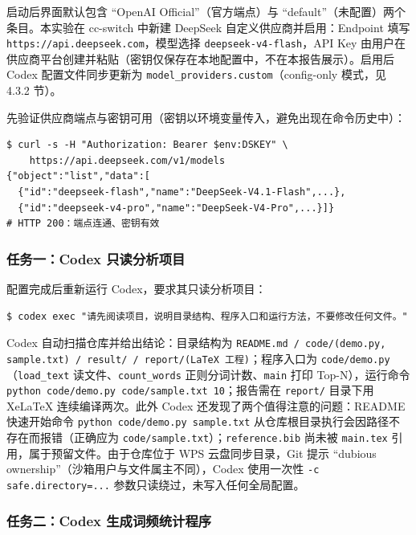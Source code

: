 \documentclass{SYSUReport}
\begin{document}
启动后界面默认包含 “OpenAI Official”（官方端点）与 “default”（未配置）两个条目。本实验在 cc-switch 中新建 DeepSeek 自定义供应商并启用：Endpoint 填写 \texttt{https://api.deepseek.com}，模型选择 \texttt{deepseek-v4-flash}，API Key 由用户在供应商平台创建并粘贴（密钥仅保存在本地配置中，不在本报告展示）。启用后 Codex 配置文件同步更新为 \texttt{model\_providers.custom}（config-only 模式，见 4.3.2 节）。

先验证供应商端点与密钥可用（密钥以环境变量传入，避免出现在命令历史中）：

\begin{lstlisting}[caption={验证 DeepSeek 供应商端点}]
$ curl -s -H "Authorization: Bearer $env:DSKEY" \
    https://api.deepseek.com/v1/models
{"object":"list","data":[
  {"id":"deepseek-flash","name":"DeepSeek-V4.1-Flash",...},
  {"id":"deepseek-v4-pro","name":"DeepSeek-V4-Pro",...}]}
# HTTP 200：端点连通、密钥有效
\end{lstlisting}

\subsubsection{任务一：Codex 只读分析项目}

配置完成后重新运行 Codex，要求其只读分析项目：

\begin{lstlisting}[caption={Codex 任务一：只读分析项目}]
$ codex exec "请先阅读项目，说明目录结构、程序入口和运行方法，不要修改任何文件。"
\end{lstlisting}

Codex 自动扫描仓库并给出结论：目录结构为 \texttt{README.md / code/(demo.py, sample.txt) / result/ / report/(LaTeX 工程)}；程序入口为 \texttt{code/demo.py}（\texttt{load\_text} 读文件、\texttt{count\_words} 正则分词计数、\texttt{main} 打印 Top-N），运行命令 \texttt{python code/demo.py code/sample.txt 10}；报告需在 \texttt{report/} 目录下用 XeLaTeX 连续编译两次。此外 Codex 还发现了两个值得注意的问题：README 快速开始命令 \texttt{python code/demo.py sample.txt} 从仓库根目录执行会因路径不存在而报错（正确应为 \texttt{code/sample.txt}）；\texttt{reference.bib} 尚未被 \texttt{main.tex} 引用，属于预留文件。由于仓库位于 WPS 云盘同步目录，Git 提示 “dubious ownership”（沙箱用户与文件属主不同），Codex 使用一次性 \texttt{-c safe.directory=...} 参数只读绕过，未写入任何全局配置。

\subsubsection{任务二：Codex 生成词频统计程序}
\end{document}
